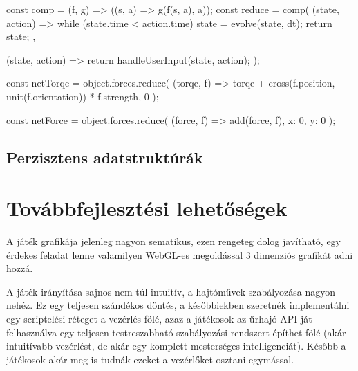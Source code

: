 \documentclass[11pt]{article}
\begin{document}
\begin{js}
  const comp = (f, g) => ((s, a) => g(f(s, a), a));
  const reduce = comp(
    (state, action) => {
      while (state.time < action.time) {
        state = evolve(state, dt);
      }
      return state;
    },

    (state, action) => {
      return handleUserInput(state, action);
    }
  );
\end{js}

\begin{js}
  const netTorqe = object.forces.reduce(
    (torqe, f) => torqe + cross(f.position, unit(f.orientation)) * f.strength,
    0
  );
\end{js}

\begin{js}
  const netForce = object.forces.reduce(
    (force, f) => add(force, f),
    { x: 0, y: 0 }
  );
\end{js}

\subsection{Perzisztens adatstruktúrák}


\section{Továbbfejlesztési lehetőségek}

A játék grafikája jelenleg nagyon sematikus, ezen rengeteg dolog javítható,
egy érdekes feladat lenne valamilyen WebGL-es megoldással 3 dimenziós grafikát
adni hozzá.

A játék irányítása sajnos nem túl intuitív, a hajtóművek szabályozása nagyon
nehéz. Ez egy teljesen szándékos döntés, a későbbiekben szeretnék implementálni
egy scriptelési réteget a vezérlés fölé, azaz a játékosok az űrhajó API-ját
felhasználva egy teljesen testreszabható szabályozási rendszert építhet fölé
(akár intuitívabb vezérlést, de akár egy komplett mesterséges intelligenciát).
Később a játékosok akár meg is tudnák ezeket a vezérlőket osztani egymással.
\end{document}
